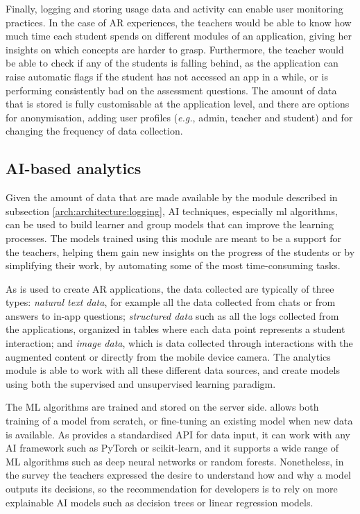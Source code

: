 Finally, logging and storing usage data and activity can enable user monitoring practices. In the case of AR experiences, the teachers would be able to know how much time each student spends on different modules of an application, giving her insights on which concepts are harder to grasp. Furthermore, the teacher would be able to check if any of the students is falling behind, as the application can raise automatic flags if the student has not accessed an app in a while, or is performing consistently bad on the assessment questions. The amount of data that is stored is fully customisable at the application level, and there are options for anonymisation, adding user profiles (\textit{e.g.}, admin, teacher and student) and for changing the frequency of data collection.

\subsection{AI-based analytics}\label{arch:architecture:AI}

Given the amount of data that are made available by the module described in subsection \ref{arch:architecture:logging}, AI techniques, especially \gls{ml} algorithms, can be used to build learner and group models that can improve the learning processes. The models trained using this module are meant to be a support for the teachers, helping them gain new insights on the progress of the students or by simplifying their work, by automating some of the most time-consuming tasks.

As \arch{} is used to create AR applications, the data collected are typically of three types: \textit{natural text data}, for example all the data collected from chats or from answers to in-app questions; \textit{structured data} such as all the logs collected from the applications, organized in tables where each data point represents a student interaction; and \textit{image data}, which is data collected through interactions with the augmented content or directly from the mobile device camera. The analytics module is able to work with all these different data sources, and create models using both the supervised and unsupervised learning paradigm.

The ML algorithms are trained and stored on the server side. \arch{} allows both training of a model from scratch, or fine-tuning an existing model when new data is available. As \arch{} provides a standardised API for data input, it can work with any AI framework such as PyTorch or scikit-learn, and it supports a wide range of ML algorithms such as deep neural networks or random forests. Nonetheless, in the survey the teachers expressed the desire to understand how and why a model outputs its decisions, so the recommendation for developers is to rely on more explainable AI models \citep{KHOSRAVI2022100074} such as decision trees or linear regression models.

